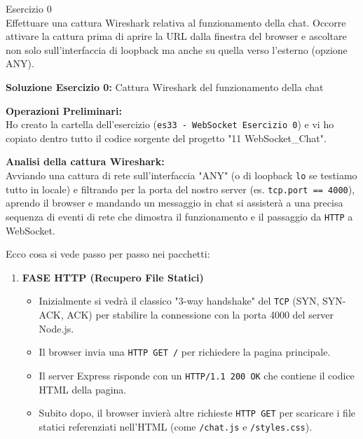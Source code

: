 \documentclass[11pt]{article}
\begin{document}
\begin{tcolorbox}[colback=blue!5!white,colframe=blue!75!black,title=\textbf{DOMANDA}, breakable]
Esercizio 0\\
Effettuare una cattura Wireshark relativa al funzionamento della chat. Occorre attivare la cattura prima di aprire la URL dalla finestra del browser e ascoltare non solo sull’interfaccia di loopback ma anche su quella verso l’esterno (opzione ANY).
\end{tcolorbox}

\begin{tcolorbox}[colback=green!5!white,colframe=green!75!black,title=\textbf{RISPOSTA}, breakable]
\textbf{Soluzione Esercizio 0:} Cattura Wireshark del funzionamento della chat

\textbf{Operazioni Preliminari:}\\
Ho creato la cartella dell'esercizio (\texttt{es33 - WebSocket Esercizio 0}) e vi ho copiato dentro tutto il codice sorgente del progetto "11 WebSocket\_Chat".

\textbf{Analisi della cattura Wireshark:}\\
Avviando una cattura di rete sull'interfaccia "ANY" (o di loopback \texttt{lo} se testiamo tutto in locale) e filtrando per la porta del nostro server (es. \texttt{tcp.port == 4000}), aprendo il browser e mandando un messaggio in chat si assisterà a una precisa sequenza di eventi di rete che dimostra il funzionamento e il passaggio da \texttt{HTTP} a WebSocket.

Ecco cosa si vede passo per passo nei pacchetti:

\begin{enumerate}
    \item \textbf{FASE HTTP (Recupero File Statici)}
    \begin{itemize}
        \item Inizialmente si vedrà il classico "3-way handshake" del \texttt{TCP} (SYN, SYN-ACK, ACK) per stabilire la connessione con la porta 4000 del server Node.js.
        \item Il browser invia una \texttt{HTTP GET /} per richiedere la pagina principale.
        \item Il server Express risponde con un \texttt{HTTP/1.1 200 OK} che contiene il codice HTML della pagina.
        \item Subito dopo, il browser invierà altre richieste \texttt{HTTP GET} per scaricare i file statici referenziati nell'HTML (come \texttt{/chat.js} e \texttt{/styles.css}).
    \end{itemize}


\end{enumerate}
\end{tcolorbox}
\end{document}
